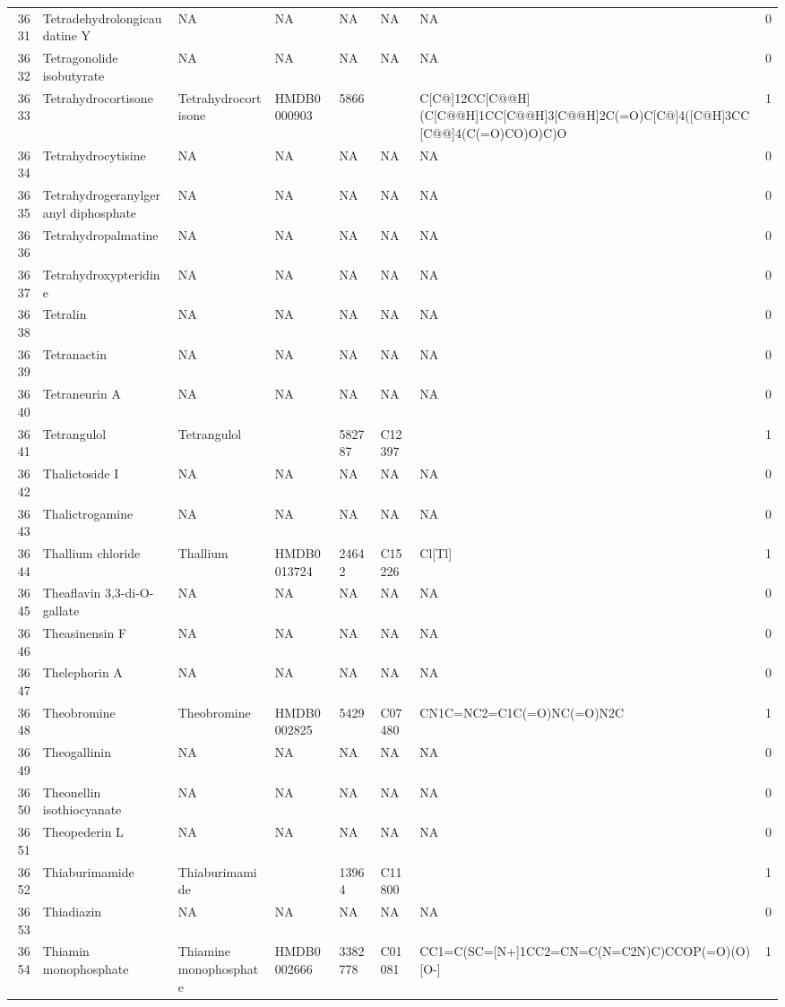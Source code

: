\documentclass[a4paper]{article}
\begin{document}
\begin{longtable}{rlllllll}
  3631 & Tetradehydrolongicaudatine Y & NA & NA & NA & NA & NA & 0 \\ 
  3632 & Tetragonolide isobutyrate & NA & NA & NA & NA & NA & 0 \\ 
  3633 & Tetrahydrocortisone & Tetrahydrocortisone & HMDB0000903 & 5866 &  & C[C@]12CC[C@@H](C[C@@H]1CC[C@@H]3[C@@H]2C(=O)C[C@]4([C@H]3CC[C@@]4(C(=O)CO)O)C)O & 1 \\ 
  3634 & Tetrahydrocytisine & NA & NA & NA & NA & NA & 0 \\ 
  3635 & Tetrahydrogeranylgeranyl diphosphate & NA & NA & NA & NA & NA & 0 \\ 
  3636 & Tetrahydropalmatine & NA & NA & NA & NA & NA & 0 \\ 
  3637 & Tetrahydroxypteridine & NA & NA & NA & NA & NA & 0 \\ 
  3638 & Tetralin & NA & NA & NA & NA & NA & 0 \\ 
  3639 & Tetranactin & NA & NA & NA & NA & NA & 0 \\ 
  3640 & Tetraneurin A & NA & NA & NA & NA & NA & 0 \\ 
  3641 & Tetrangulol & Tetrangulol &  & 582787 & C12397 &  & 1 \\ 
  3642 & Thalictoside I & NA & NA & NA & NA & NA & 0 \\ 
  3643 & Thalictrogamine & NA & NA & NA & NA & NA & 0 \\ 
  3644 & Thallium chloride & Thallium & HMDB0013724 & 24642 & C15226 & Cl[Tl] & 1 \\ 
  3645 & Theaflavin 3,3-di-O-gallate & NA & NA & NA & NA & NA & 0 \\ 
  3646 & Theasinensin F & NA & NA & NA & NA & NA & 0 \\ 
  3647 & Thelephorin A & NA & NA & NA & NA & NA & 0 \\ 
  3648 & Theobromine & Theobromine & HMDB0002825 & 5429 & C07480 & CN1C=NC2=C1C(=O)NC(=O)N2C & 1 \\ 
  3649 & Theogallinin & NA & NA & NA & NA & NA & 0 \\ 
  3650 & Theonellin isothiocyanate & NA & NA & NA & NA & NA & 0 \\ 
  3651 & Theopederin L & NA & NA & NA & NA & NA & 0 \\ 
  3652 & Thiaburimamide & Thiaburimamide &  & 13964 & C11800 &  & 1 \\ 
  3653 & Thiadiazin & NA & NA & NA & NA & NA & 0 \\ 
  3654 & Thiamin monophosphate & Thiamine monophosphate & HMDB0002666 & 3382778 & C01081 & CC1=C(SC=[N+]1CC2=CN=C(N=C2N)C)CCOP(=O)(O)[O-] & 1 \\ 

\end{longtable}
\end{document}
